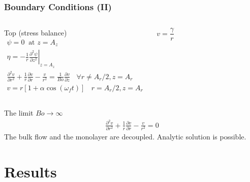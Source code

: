 \documentclass[compress]{beamer}
\begin{document}
\begin{frame} \frametitle{Boundary Conditions (II)}
\begin{columns}
\vspace{-5mm}
{\small
\begin{block}{Top (stress balance)}
\vspace{-5mm}
\begin{align*}
\psi=0~\text{ at } z=A_z\\
\eta=\left.-\frac{1}{r}\frac{\partial^2\psi}{\partial z^2}\right|_{z=A_z}\\
\frac{\partial^2 v}{\partial r^2}+\frac{1}{r}\frac{\partial v}{\partial r}-\frac{v}{r^2} = \frac{1}{Bo}\frac{\partial v}{\partial z}~~~~ \forall r\neq A_r/2, z=A_r\\
v=r\left[1+\alpha\cos(\omega_ft)\right] ~~~~ r= A_r/2, z=A_r
\end{align*}
\end{block}}
$$v = \frac{\gamma}{r}$$
\end{columns}
\pause
{\small
\begin{block}{The limit $Bo\rightarrow\infty$}
\vspace{-4mm}
\begin{align*}
\frac{\partial^2 v}{\partial r^2}+\frac{1}{r}\frac{\partial v}{\partial r}-\frac{v}{r^2} = 0
\end{align*}
The bulk flow and the monolayer are decoupled.
Analytic solution is possible.
\end{block}}

\end{frame}

\section[Results]{Results}
\end{document}
